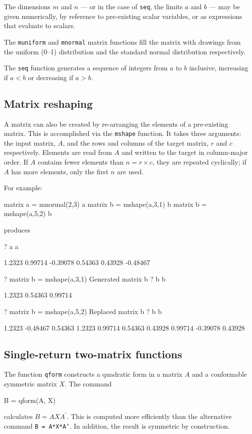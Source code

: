 The dimensions $m$ and $n$ --- or in the case of \texttt{seq}, the
limits $a$ and $b$ --- may be given numerically, by reference to
pre-existing scalar variables, or as expressions that evaluate to
scalars.

The \texttt{muniform} and \texttt{mnormal} matrix functions fill the
matrix with drawings from the uniform (0--1) distribution and the
standard normal distribution respectively.

The \texttt{seq} function generates a sequence of integers from $a$
to $b$ inclusive, increasing if $a<b$ or decreasing if $a>b$.

\subsection{Matrix reshaping}
\label{matrix-mshape}

A matrix can also be created by re-arranging the elements of a
pre-existing matrix. This is accomplished via the \texttt{mshape}
function. It takes three arguments: the input matrix, $A$, and the
rows and columns of the target matrix, $r$ and $c$ respectively.
Elements are read from $A$ and written to the target in column-major
order.  If $A$ contains fewer elements than $n = r \times c$, they are
repeated cyclically; if $A$ has more elements, only the first $n$ are
used.

For example:
\begin{code}
matrix a = mnormal(2,3)
a
matrix b = mshape(a,3,1)
b
matrix b = mshape(a,5,2)
b
\end{code}
produces
\begin{code}
?   a
a

      1.2323      0.99714     -0.39078
     0.54363      0.43928     -0.48467

?   matrix b = mshape(a,3,1)
Generated matrix b
?   b
b

      1.2323
     0.54363
     0.99714

?   matrix b = mshape(a,5,2)
Replaced matrix b
?   b
b

      1.2323     -0.48467
     0.54363       1.2323
     0.99714      0.54363
     0.43928      0.99714
    -0.39078      0.43928
\end{code}

\subsection{Single-return two-matrix functions}
\label{matrix-two}

The function \texttt{qform} constructs a quadratic form in a matrix
$A$ and a conformable symmetric matrix $X$.  The command
%
\begin{code}
B = qform(A, X)
\end{code}
%
calculates $B = A X A^{\prime}$.  This is computed more efficiently than
the alternative command \texttt{B = A*X*A'}.  In addition, the result
is symmetric by construction.

